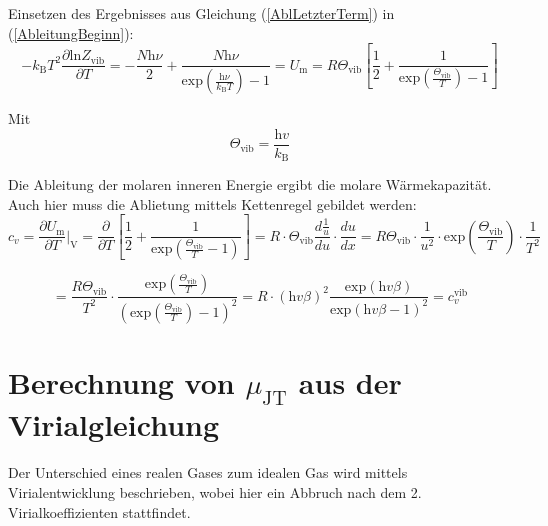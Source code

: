 \documentclass[a4paper,12pt,oneside,onecolum,final,openany]{report}
\begin{document}
Einsetzen des Ergebnisses aus Gleichung (\ref{AblLetzterTerm}) in (\ref{AbleitungBeginn}):\\

\begin{equation}
-k_\mathrm{B}T^2 \frac{\partial \mathrm{ln}Z_\mathrm{vib}}{\partial T}= - \frac{N\mathrm{\mathrm{h}}\nu}{2} + \frac{N \mathrm{\mathrm{h}}\nu}{\mathrm{exp}(\frac{\mathrm{\mathrm{h}}\nu}{k_\mathrm{B}T})-1}= U_\mathrm{m}=R \Theta_\mathrm{vib} \left[ \frac{1}{2} + \frac{1}{\mathrm{exp}(\frac{\Theta_\mathrm{vib}}{T}) -1}\right]
\end{equation}

Mit\\

\begin{equation}
\Theta_\mathrm{vib} = \frac{\mathrm{h}v}{k_\mathrm{B}}
\end{equation}

Die Ableitung der molaren inneren Energie ergibt die molare Wärmekapazität. Auch hier muss die Ablietung mittels Kettenregel gebildet werden:\\


\begin{equation}
c_v = \frac{\partial U_\mathrm{m}}{\partial T}\bigg \vert_\mathrm{V} = \frac{\partial}{\partial T} \left[\frac{1}{2} + \frac{1}{\mathrm{exp}(\frac{\Theta_\mathrm{vib}}{T}-1)} \right] = R\cdot \Theta_\mathrm{vib} \frac{d\frac{1}{u}}{du} \cdot \frac{du}{dx} =R\Theta_\mathrm{vib} \cdot \frac{1}{u^2} \cdot \mathrm{exp}(\frac{\Theta_\mathrm{vib}}{T})\cdot \frac{1}{T^2}
\end{equation}

\begin{equation}
= \frac{R\Theta_\mathrm{vib}}{T^2} \cdot \frac{\mathrm{exp}(\frac{\Theta_\mathrm{vib}}{T})}{(\mathrm{exp}(\frac{\Theta_\mathrm{vib}}{T})-1)^2} = R\cdot(\mathrm{h}v\beta)^2 \frac{\mathrm{exp}(\mathrm{h}v\beta)}{\mathrm{exp}(\mathrm{h}v\beta -1)^2} =c_v^\mathrm{vib}
\end{equation}


\section{Berechnung von $\mu_\mathrm{JT}$ aus der Virialgleichung}

Der Unterschied eines realen Gases zum idealen Gas wird mittels Virialentwicklung beschrieben, wobei hier ein Abbruch nach dem 2. Virialkoeffizienten stattfindet.\\
\end{document}
